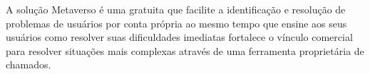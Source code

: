 		A solução Metaverso é uma gratuita que facilite a identificação e resolução de problemas de usuários por conta própria ao mesmo tempo que ensine aos seus usuários como resolver suas dificuldades imediatas fortalece o vínculo comercial para resolver situações mais complexas através de uma ferramenta proprietária de chamados.
	

